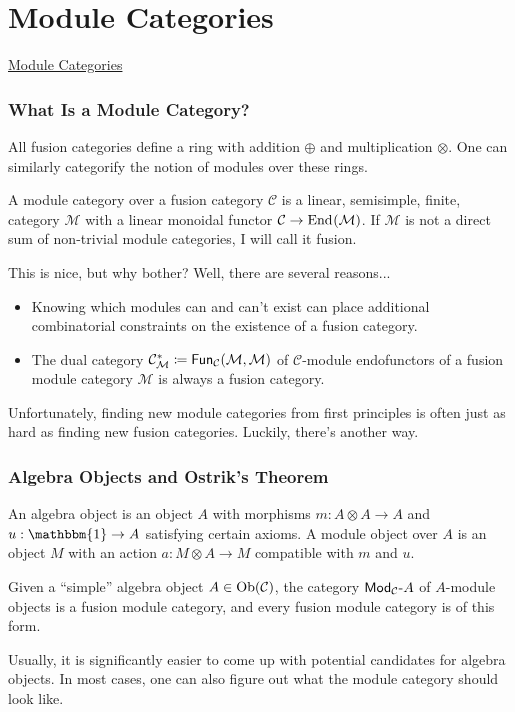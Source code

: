 \documentclass{beamer}
\theoremstyle{plain}
\theoremstyle{definition}
\newcommand{\mathcat}[1]{\mathcal{#1}}
\newcommand{\Ob}{\textup{Ob}}
\newcommand{\End}[2][]{
	\ifthenelse{\equal{#2}{}}
		{\textup{End}_{#1}}
		{\textup{End}_{#1}\!\left(#2\right)}
}
\newcommand{\Fun}[2][]{
	\ifthenelse{\equal{#2}{}}
		{\textcat{Fun}_{#1}}
		{\textcat{Fun}_{#1}\!\left(#2\right)}
}
\newcommand{\textcat}[1]{\textup{\textsf{#1}}}
\newcommand{\rmodcat}[2][]{\textcat{Mod}_{#1}\textcat{-}#2}
\begin{document}

\section{Module Categories}

\begin{frame}
\centerline{\Huge\textcolor{structure}{\underline{Module Categories}}}
\end{frame}

\begin{frame}
\frametitle{What Is a Module Category?}
All fusion categories define a ring with addition $\oplus$ and multiplication $\otimes$. One can similarly categorify the notion of modules over these rings.
\begin{definition}
A \textcolor{structure}{module category} over a fusion category $\mathcat{C}$ is a linear, semisimple, finite, category $\mathcat{M}$ with a linear monoidal functor $\mathcat{C} \to \End{\mathcat{M}}$. If $\mathcat{M}$ is not a direct sum of non-trivial module categories, I will call it \textcolor{structure}{fusion}.
\end{definition}
This is nice, but why bother? Well, there are several reasons...
\medskip
\begin{itemize}
	\item Knowing which modules can and can't exist can place additional combinatorial constraints on the existence of a fusion category.
	\item The \textcolor{structure}{dual category $\mathcat{C}_{\mathcat{M}}^{*} \coloneqq \Fun[\mathcat{C}]{\mathcat{M}, \mathcat{M}}$} of $\mathcat{C}$-module endofunctors of a fusion module category $\mathcat{M}$ is always a fusion category.
\end{itemize}
\medskip
Unfortunately, finding new module categories from first principles is often just as hard as finding new fusion categories. Luckily, there's another way.
\end{frame}

\begin{frame}
\frametitle{Algebra Objects and Ostrik's Theorem}
\begin{definition}
An \textcolor{structure}{algebra object} is an object $A$ with morphisms $m : A \otimes A \to A$ and $u : \mathbbm{1} \to A$ satisfying certain axioms. A \textcolor{structure}{module object} over $A$ is an object $M$ with an action $a : M \otimes A \to M$ compatible with $m$ and $u$.
\end{definition}
\begin{theorem}
Given a ``simple'' algebra object $A \in \Ob(\mathcat{C})$, the category $\rmodcat[\mathcat{C}]{A}$ of $A$-module objects is a fusion module category, and every fusion module category is of this form.
\end{theorem}
Usually, it is significantly easier to come up with potential candidates for algebra objects. In most cases, one can also figure out what the module category should look like.
\end{frame}
\end{document}
